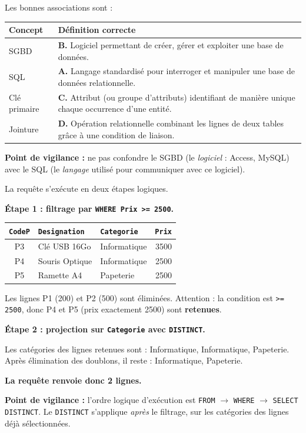 \documentclass[11pt]{article}
\begin{document}
\begin{corrige}
Les bonnes associations sont :
\begin{center}
\begin{tabularx}{\linewidth}{|l|X|}
\hline
\rowcolor{popblueL} \textbf{Concept} & \textbf{Définition correcte} \\ \hline
SGBD & \textbf{B.} Logiciel permettant de créer, gérer et exploiter une base de données. \\ \hline
SQL & \textbf{A.} Langage standardisé pour interroger et manipuler une base de données relationnelle. \\ \hline
Clé primaire & \textbf{C.} Attribut (ou groupe d'attributs) identifiant de manière unique chaque occurrence d'une entité. \\ \hline
Jointure & \textbf{D.} Opération relationnelle combinant les lignes de deux tables grâce à une condition de liaison. \\ \hline
\end{tabularx}
\end{center}
\textbf{Point de vigilance :} ne pas confondre le SGBD (le \emph{logiciel} : Access, MySQL) avec le SQL (le \emph{langage} utilisé pour communiquer avec ce logiciel).
\end{corrige}

\begin{corrige}
La requête s'exécute en deux étapes logiques.

\textbf{Étape 1 : filtrage par \texttt{WHERE Prix >= 2500}.}

\begin{center}
\begin{tabular}{|c|l|l|r|}
\hline
\texttt{CodeP} & \texttt{Designation} & \texttt{Categorie} & \texttt{Prix} \\ \hline
P3 & Clé USB 16Go & Informatique & 3500 \\
P4 & Souris Optique & Informatique & 2500 \\
P5 & Ramette A4 & Papeterie & 2500 \\
\hline
\end{tabular}
\end{center}

Les lignes P1 (200) et P2 (500) sont éliminées. Attention : la condition est \texttt{>= 2500}, donc P4 et P5 (prix exactement 2500) sont \textbf{retenues}.

\textbf{Étape 2 : projection sur \texttt{Categorie} avec \texttt{DISTINCT}.}

Les catégories des lignes retenues sont : Informatique, Informatique, Papeterie. Après élimination des doublons, il reste : Informatique, Papeterie.

\textbf{La requête renvoie donc 2 lignes.}

\textbf{Point de vigilance :} l'ordre logique d'exécution est \texttt{FROM} $\rightarrow$ \texttt{WHERE} $\rightarrow$ \texttt{SELECT DISTINCT}. Le \texttt{DISTINCT} s'applique \emph{après} le filtrage, sur les catégories des lignes déjà sélectionnées.
\end{corrige}
\end{document}
